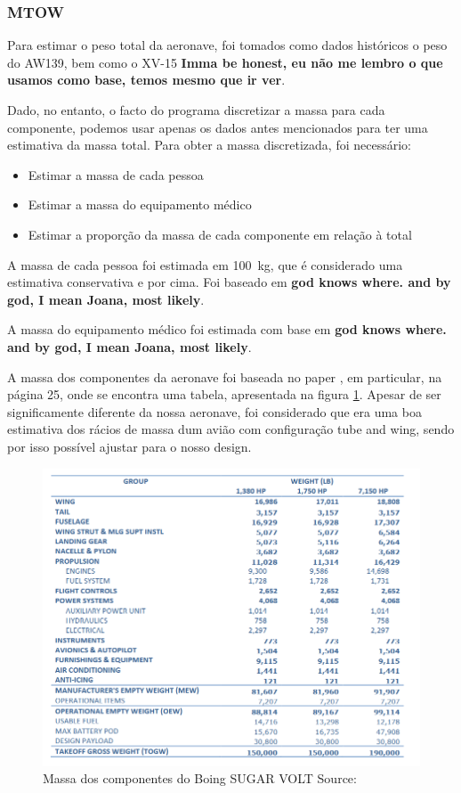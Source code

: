 \subsubsection{MTOW}
Para estimar o peso total da aeronave, foi tomados como dados históricos o peso do AW139, bem como o XV-15 {\large{\textbf{Imma be honest, eu não me lembro o que usamos como base, temos mesmo que ir ver}}}.\par
Dado, no entanto, o facto do programa discretizar a massa para cada componente, podemos usar apenas os dados antes mencionados para ter uma estimativa da massa total. Para obter a massa discretizada, foi necessário:
\begin{itemize}
    \item Estimar a massa de cada pessoa
    \item Estimar a massa do equipamento médico
    \item Estimar a proporção da massa de cada componente em relação à total
\end{itemize}
A massa de cada pessoa foi estimada em 100~kg, que é considerado uma estimativa conservativa e por cima. Foi baseado em {\large{\textbf{god knows where. and by god, I mean Joana, most likely}}}.\par
A massa do equipamento médico foi estimada com base em {\large{\textbf{god knows where. and by god, I mean Joana, most likely}}}.\par
A massa dos componentes da aeronave foi baseada no paper \cite{Bradley2015-yr}, em particular, na página 25, onde se encontra uma tabela, apresentada na figura \ref{sugartable}. Apesar de ser significamente diferente da nossa aeronave, foi considerado que era uma boa estimativa dos rácios de massa dum avião com configuração tube and wing, sendo por isso possível ajustar para o nosso design.\par
\FloatBarrier
\begin{figure}[h]
    \centering
    \includegraphics[width=\textwidth]{Imagens/boing sugar.PNG}
    \caption{Massa dos componentes do Boing SUGAR VOLT Source:\cite{Bradley2015-yr}}
    \label{sugartable}
\end{figure}
